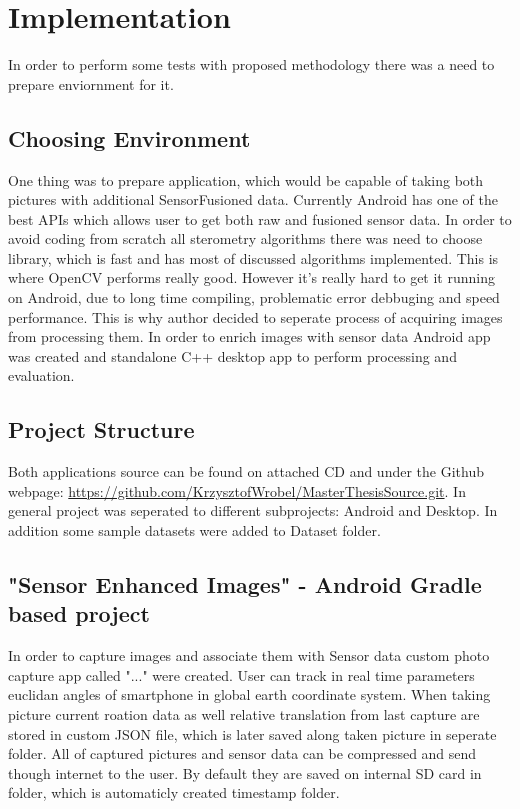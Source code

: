 \raggedbottom
\chapter{Implementation} %
In order to perform some tests with proposed methodology there was a need to prepare enviornment for it. 
\section{Choosing Environment}
One thing was to prepare application, which would be capable of taking both pictures with additional SensorFusioned data. Currently Android has one of the best APIs which allows user to get both raw and fusioned sensor data. In order to avoid coding from scratch all sterometry algorithms there was need to choose library, which is fast and has most of discussed algorithms implemented. This is where OpenCV performs really good. However it's really hard to get it running on Android, due to long time compiling, problematic error debbuging and speed performance. This is why author decided to seperate process of acquiring images from processing them. In order to enrich images with sensor data Android app was created and standalone C++ desktop app to perform processing and evaluation.
\section{Project Structure} \label{sec:ProjectStructure}
Both applications source can be found on attached CD and under the Github webpage: \url{https://github.com/KrzysztofWrobel/MasterThesisSource.git}. In general project was seperated to different subprojects: Android and Desktop. In addition some sample datasets were added to Dataset folder.
\section{"Sensor Enhanced Images" - Android Gradle based project}
In order to capture images and associate them with Sensor data custom photo capture app called "..." were created. User can track in real time parameters euclidan angles of smartphone in global earth coordinate system. When taking picture current roation data as well relative translation from last capture are stored in custom JSON file, which is later saved along taken picture in seperate folder. All of captured pictures and sensor data can be compressed and send though internet to the user. By default they are saved on internal SD card in folder, which is automaticly created timestamp folder.
